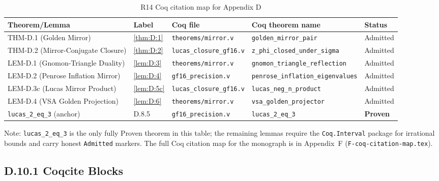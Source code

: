\begin{table}[h]
\centering
\caption{R14 Coq citation map for Appendix D}
\begin{tabular}{lllll}
\toprule
Theorem/Lemma & Label & Coq file & Coq theorem name & Status \\
\midrule
THM-D.1 (Golden Mirror) & \ref{thm:D:1} & \texttt{theorems/mirror.v} & \texttt{golden\_mirror\_pair} & Admitted \\
THM-D.2 (Mirror-Conjugate Closure) & \ref{thm:D:2} & \texttt{lucas\_closure\_gf16.v} & \texttt{z\_phi\_closed\_under\_sigma} & Admitted \\
LEM-D.1 (Gnomon-Triangle Duality) & \ref{lem:D:3} & \texttt{theorems/mirror.v} & \texttt{gnomon\_triangle\_reflection} & Admitted \\
LEM-D.2 (Penrose Inflation Mirror) & \ref{lem:D:4} & \texttt{gf16\_precision.v} & \texttt{penrose\_inflation\_eigenvalues} & Admitted \\
LEM-D.3c (Lucas Mirror Product) & \ref{lem:D:5c} & \texttt{lucas\_closure\_gf16.v} & \texttt{lucas\_neg\_n\_product} & Admitted \\
LEM-D.4 (VSA Golden Projection) & \ref{lem:D:6} & \texttt{theorems/mirror.v} & \texttt{vsa\_golden\_projector} & Admitted \\
\texttt{lucas\_2\_eq\_3} (anchor) & D.8.5 & \texttt{gf16\_precision.v} & \texttt{lucas\_2\_eq\_3} & \textbf{Proven} \\
\bottomrule
\end{tabular}
\end{table}

\noindent Note: \texttt{lucas\_2\_eq\_3} is the only fully Proven theorem in this
table; the remaining lemmas require the \texttt{Coq.Interval} package for
irrational bounds and carry honest \texttt{Admitted} markers.
The full Coq citation map for the monograph is in Appendix~F
(\texttt{F-coq-citation-map.tex}).

\subsection*{D.10.1  Coqcite Blocks}





